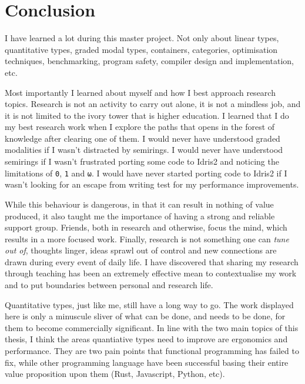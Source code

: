 \documentclass[
]{article}
\begin{document}
\newpage

\hypertarget{conclusion}{%
\section{Conclusion}\label{conclusion}}

I have learned a lot during this master project. Not only about linear
types, quantitative types, graded modal types, containers, categories,
optimisation techniques, benchmarking, program safety, compiler design
and implementation, etc.

Most importantly I learned about myself and how I best approach research
topics. Research is not an activity to carry out alone, it is not a
mindless job, and it is not limited to the ivory tower that is higher
education. I learned that I do my best research work when I explore the
paths that opens in the forest of knowledge after clearing one of them.
I would never have understood graded modalities if I wasn't distracted
by semirings. I would never have understood semirings if I wasn't
frustrated porting some code to Idris2 and noticing the limitations of
\texttt{0}, \texttt{1} and \texttt{ω}. I would have never started
porting code to Idris2 if I wasn't looking for an escape from writing
test for my performance improvements.

While this behaviour is dangerous, in that it can result in nothing of
value produced, it also taught me the importance of having a strong and
reliable support group. Friends, both in research and otherwise, focus
the mind, which results in a more focused work. Finally, research is not
something one can \emph{tune out of}, thoughts linger, ideas sprawl out
of control and new connections are drawn during every event of daily
life. I have discovered that sharing my research through teaching has
been an extremely effective mean to contextualise my work and to put
boundaries between personal and research life.

Quantitative types, just like me, still have a long way to go. The work
displayed here is only a minuscule sliver of what can be done, and needs
to be done, for them to become commercially significant. In line with
the two main topics of this thesis, I think the areas quantiative types
need to improve are ergonomics and performance. They are two pain points
that functional programming has failed to fix, while other programming
language have been successful basing their entire value proposition upon
them (Rust, Javascript, Python, etc).
\end{document}
